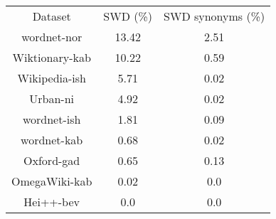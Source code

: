 \begin{tabular}{ccc}
    Dataset        & SWD (\%) & SWD synonyms (\%) \\
    wordnet-nor    & 13.42    & 2.51              \\
    Wiktionary-kab & 10.22    & 0.59              \\
    Wikipedia-ish  & 5.71     & 0.02              \\
    Urban-ni       & 4.92     & 0.02              \\
    wordnet-ish    & 1.81     & 0.09              \\
    wordnet-kab    & 0.68     & 0.02              \\
    Oxford-gad     & 0.65     & 0.13              \\
    OmegaWiki-kab  & 0.02     & 0.0               \\
    Hei++-bev      & 0.0      & 0.0               \\
\end{tabular}
